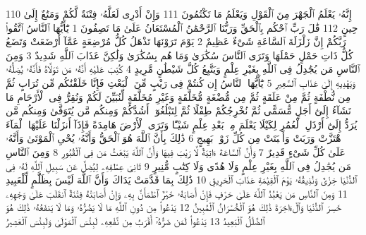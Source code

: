 {\tiny\colorbox{cl_aya}{110}} إِنَّهُۥ يَعْلَمُ ٱلْجَهْرَ مِنَ ٱلْقَوْلِ وَيَعْلَمُ مَا تَكْتُمُونَ
{\tiny\colorbox{cl_aya}{111}} وَإِنْ أَدْرِى لَعَلَّهُۥ فِتْنَةٌ لَّكُمْ وَمَتَٰعٌ إِلَىٰ حِينٍ
{\tiny\colorbox{cl_aya}{112}} قَٰلَ رَبِّ ٱحْكُم بِٱلْحَقِّ وَرَبُّنَا ٱلرَّحْمَٰنُ ٱلْمُسْتَعَانُ عَلَىٰ مَا تَصِفُونَ
{\tiny\colorbox{cl_aya}{1}} يَٰٓأَيُّهَا ٱلنَّاسُ ٱتَّقُوا۟ رَبَّكُمْ إِنَّ زَلْزَلَةَ ٱلسَّاعَةِ شَىْءٌ عَظِيمٌ
{\tiny\colorbox{cl_aya}{2}} يَوْمَ تَرَوْنَهَا تَذْهَلُ كُلُّ مُرْضِعَةٍ عَمَّآ أَرْضَعَتْ وَتَضَعُ كُلُّ ذَاتِ حَمْلٍ حَمْلَهَا وَتَرَى ٱلنَّاسَ سُكَٰرَىٰ وَمَا هُم بِسُكَٰرَىٰ وَلَٰكِنَّ عَذَابَ ٱللَّهِ شَدِيدٌ
{\tiny\colorbox{cl_aya}{3}} وَمِنَ ٱلنَّاسِ مَن يُجَٰدِلُ فِى ٱللَّهِ بِغَيْرِ عِلْمٍ وَيَتَّبِعُ كُلَّ شَيْطَٰنٍ مَّرِيدٍ
{\tiny\colorbox{cl_aya}{4}} كُتِبَ عَلَيْهِ أَنَّهُۥ مَن تَوَلَّاهُ فَأَنَّهُۥ يُضِلُّهُۥ وَيَهْدِيهِ إِلَىٰ عَذَابِ ٱلسَّعِيرِ
{\tiny\colorbox{cl_aya}{5}} يَٰٓأَيُّهَا ٱلنَّاسُ إِن كُنتُمْ فِى رَيْبٍ مِّنَ ٱلْبَعْثِ فَإِنَّا خَلَقْنَٰكُم مِّن تُرَابٍ ثُمَّ مِن نُّطْفَةٍ ثُمَّ مِنْ عَلَقَةٍ ثُمَّ مِن مُّضْغَةٍ مُّخَلَّقَةٍ وَغَيْرِ مُخَلَّقَةٍ لِّنُبَيِّنَ لَكُمْ وَنُقِرُّ فِى ٱلْأَرْحَامِ مَا نَشَآءُ إِلَىٰٓ أَجَلٍ مُّسَمًّى ثُمَّ نُخْرِجُكُمْ طِفْلًا ثُمَّ لِتَبْلُغُوٓا۟ أَشُدَّكُمْ وَمِنكُم مَّن يُتَوَفَّىٰ وَمِنكُم مَّن يُرَدُّ إِلَىٰٓ أَرْذَلِ ٱلْعُمُرِ لِكَيْلَا يَعْلَمَ مِنۢ بَعْدِ عِلْمٍ شَيْـًٔا وَتَرَى ٱلْأَرْضَ هَامِدَةً فَإِذَآ أَنزَلْنَا عَلَيْهَا ٱلْمَآءَ ٱهْتَزَّتْ وَرَبَتْ وَأَنۢبَتَتْ مِن كُلِّ زَوْجٍۭ بَهِيجٍ
{\tiny\colorbox{cl_aya}{6}} ذَٰلِكَ بِأَنَّ ٱللَّهَ هُوَ ٱلْحَقُّ وَأَنَّهُۥ يُحْىِ ٱلْمَوْتَىٰ وَأَنَّهُۥ عَلَىٰ كُلِّ شَىْءٍ قَدِيرٌ
{\tiny\colorbox{cl_aya}{7}} وَأَنَّ ٱلسَّاعَةَ ءَاتِيَةٌ لَّا رَيْبَ فِيهَا وَأَنَّ ٱللَّهَ يَبْعَثُ مَن فِى ٱلْقُبُورِ
{\tiny\colorbox{cl_aya}{8}} وَمِنَ ٱلنَّاسِ مَن يُجَٰدِلُ فِى ٱللَّهِ بِغَيْرِ عِلْمٍ وَلَا هُدًى وَلَا كِتَٰبٍ مُّنِيرٍ
{\tiny\colorbox{cl_aya}{9}} ثَانِىَ عِطْفِهِۦ لِيُضِلَّ عَن سَبِيلِ ٱللَّهِ لَهُۥ فِى ٱلدُّنْيَا خِزْىٌ وَنُذِيقُهُۥ يَوْمَ ٱلْقِيَٰمَةِ عَذَابَ ٱلْحَرِيقِ
{\tiny\colorbox{cl_aya}{10}} ذَٰلِكَ بِمَا قَدَّمَتْ يَدَاكَ وَأَنَّ ٱللَّهَ لَيْسَ بِظَلَّٰمٍ لِّلْعَبِيدِ
{\tiny\colorbox{cl_aya}{11}} وَمِنَ ٱلنَّاسِ مَن يَعْبُدُ ٱللَّهَ عَلَىٰ حَرْفٍ فَإِنْ أَصَابَهُۥ خَيْرٌ ٱطْمَأَنَّ بِهِۦ وَإِنْ أَصَابَتْهُ فِتْنَةٌ ٱنقَلَبَ عَلَىٰ وَجْهِهِۦ خَسِرَ ٱلدُّنْيَا وَٱلْءَاخِرَةَ ذَٰلِكَ هُوَ ٱلْخُسْرَانُ ٱلْمُبِينُ
{\tiny\colorbox{cl_aya}{12}} يَدْعُوا۟ مِن دُونِ ٱللَّهِ مَا لَا يَضُرُّهُۥ وَمَا لَا يَنفَعُهُۥ ذَٰلِكَ هُوَ ٱلضَّلَٰلُ ٱلْبَعِيدُ
{\tiny\colorbox{cl_aya}{13}} يَدْعُوا۟ لَمَن ضَرُّهُۥٓ أَقْرَبُ مِن نَّفْعِهِۦ لَبِئْسَ ٱلْمَوْلَىٰ وَلَبِئْسَ ٱلْعَشِيرُ
